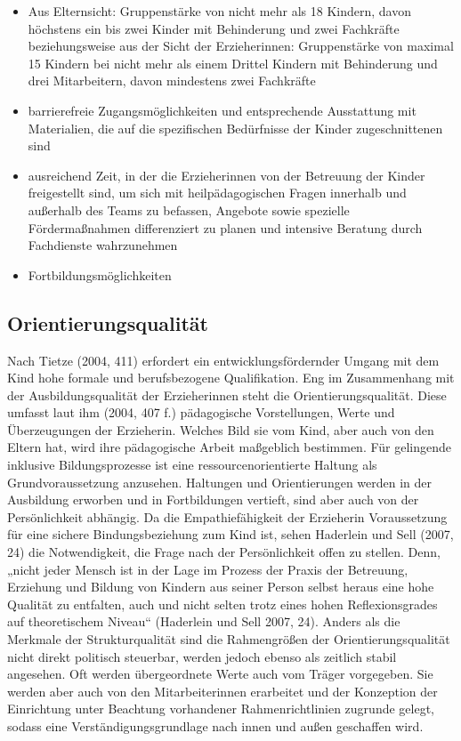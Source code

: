 \begin{itemize}
\item Aus Elternsicht: Gruppenstärke von nicht mehr als 18 Kindern, davon höchstens ein bis zwei Kinder mit Behinderung und zwei Fachkräfte 
beziehungsweise 
aus der Sicht der Erzieherinnen: Gruppenstärke von maximal 15 Kindern bei nicht mehr als einem Drittel Kindern mit Behinderung und drei Mitarbeitern, davon mindestens zwei Fachkräfte
\item barrierefreie Zugangsmöglichkeiten und entsprechende Ausstattung mit Materialien, die auf die spezifischen Bedürfnisse der Kinder zugeschnittenen sind
\item ausreichend Zeit, in der die Erzieherinnen von der Betreuung der Kinder freigestellt sind, um sich mit heilpädagogischen Fragen innerhalb und außerhalb des Teams zu befassen, Angebote sowie spezielle Fördermaßnahmen differenziert zu planen und intensive Beratung durch Fachdienste wahrzunehmen
\item Fortbildungsmöglichkeiten
\end{itemize}

\subsection{Orientierungsqualität}
Nach Tietze (2004, 411) erfordert ein entwicklungsfördernder Umgang mit dem Kind hohe formale und berufsbezogene Qualifikation. Eng im Zusammenhang mit der Ausbildungsqualität der Erzieherinnen steht die Orientierungsqualität. Diese umfasst laut ihm (2004, 407 f.) pädagogische Vorstellungen, Werte und Überzeugungen der Erzieherin. Welches Bild sie vom Kind, aber auch von den Eltern hat, wird ihre pädagogische Arbeit maßgeblich bestimmen. Für gelingende inklusive Bildungsprozesse ist eine ressourcenorientierte Haltung als Grundvoraussetzung anzusehen. Haltungen und Orientierungen werden in der Ausbildung erworben und in Fortbildungen vertieft, sind aber auch von der Persönlichkeit abhängig. 
Da die Empathiefähigkeit der Erzieherin Voraussetzung für eine sichere Bindungsbeziehung zum Kind ist, sehen Haderlein und Sell (2007, 24) die Notwendigkeit, die Frage nach der Persönlichkeit offen zu stellen. Denn, „nicht jeder Mensch ist in der Lage im Prozess der Praxis der Betreuung, Erziehung und Bildung von Kindern aus seiner Person selbst heraus eine hohe Qualität zu entfalten, auch und nicht selten trotz eines hohen Reflexionsgrades auf theoretischem Niveau“ (Haderlein und Sell 2007, 24). Anders als die Merkmale der Strukturqualität sind die Rahmengrößen der Orientierungsqualität nicht direkt politisch steuerbar, werden jedoch ebenso als zeitlich stabil angesehen. Oft werden übergeordnete Werte auch vom Träger vorgegeben. Sie werden aber auch von den Mitarbeiterinnen erarbeitet und der Konzeption der Einrichtung unter Beachtung vorhandener Rahmenrichtlinien zugrunde gelegt, sodass eine Verständigungsgrundlage nach innen und außen geschaffen wird. 

